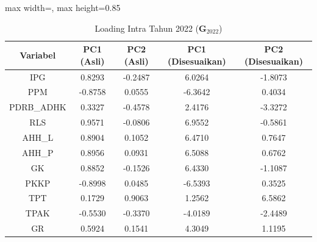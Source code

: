 \begin{table}[H]
\centering
\caption{Loading Intra Tahun 2022 ($\mathbf{G}_{2022}$)} \label{tab:app1loading_intra_2022}
\begin{adjustbox}{max width=\textwidth, max height=0.85\textheight}
\begin{tabular}{|c|c|c|c|c|}
\hline
\textbf{Variabel} & \textbf{PC1 (Asli)} & \textbf{PC2 (Asli)} & \textbf{PC1 (Disesuaikan)} & \textbf{PC2 (Disesuaikan)} \\
\hline
IPG & 0.8293 & -0.2487 & 6.0264 & -1.8073 \\
PPM & -0.8758 & 0.0555 & -6.3642 & 0.4034 \\
PDRB\_ADHK & 0.3327 & -0.4578 & 2.4176 & -3.3272 \\
RLS & 0.9571 & -0.0806 & 6.9552 & -0.5861 \\
AHH\_L & 0.8904 & 0.1052 & 6.4710 & 0.7647 \\
AHH\_P & 0.8956 & 0.0931 & 6.5088 & 0.6762 \\
GK & 0.8852 & -0.1526 & 6.4330 & -1.1087 \\
PKKP & -0.8998 & 0.0485 & -6.5393 & 0.3525 \\
TPT & 0.1729 & 0.9063 & 1.2562 & 6.5862 \\
TPAK & -0.5530 & -0.3370 & -4.0189 & -2.4489 \\
GR & 0.5924 & 0.1541 & 4.3049 & 1.1195 \\
\hline
\end{tabular}
\end{adjustbox}
\end{table}